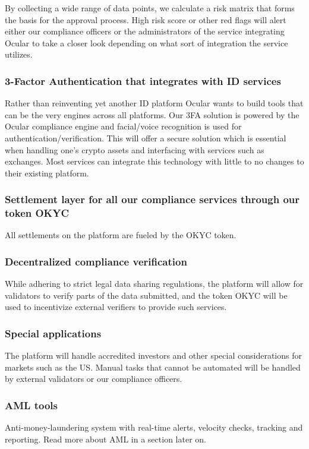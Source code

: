 \documentclass[12pt]{article}
\begin{document}
By collecting a wide range of data points, we calculate a risk matrix that forms the basis for the approval process. High risk score or other red flags will alert either our compliance officers or the administrators of the service integrating Ocular to take a closer look depending on what sort of integration the service utilizes. 


\subsubsection*{3-Factor Authentication that integrates with ID services}
Rather than reinventing yet another ID platform Ocular wants to build tools that can be the very engines across all platforms. Our 3FA solution is powered by the Ocular compliance engine and facial/voice recognition is used for authentication/verification. This will offer a secure solution which is essential when handling one's crypto assets and interfacing with services such as exchanges. Most services can integrate this technology with little to no changes to their existing platform. 


\subsubsection*{Settlement layer for all our compliance services through our token OKYC}
All settlements on the platform are fueled by the OKYC token. 

\subsubsection*{Decentralized compliance verification}

While adhering to strict legal data sharing regulations, the platform will allow for validators to verify parts of the data submitted, and the token OKYC will be used to incentivize external verifiers to provide such services.

\subsubsection*{Special applications}
The platform will handle accredited investors and other special considerations for markets such as the US. Manual tasks that cannot be automated will be handled by external validators or our compliance officers. 

\subsubsection*{AML tools}
Anti-money-laundering system with real-time alerts, velocity checks, tracking and reporting. Read more about AML in a section later on.
\end{document}
